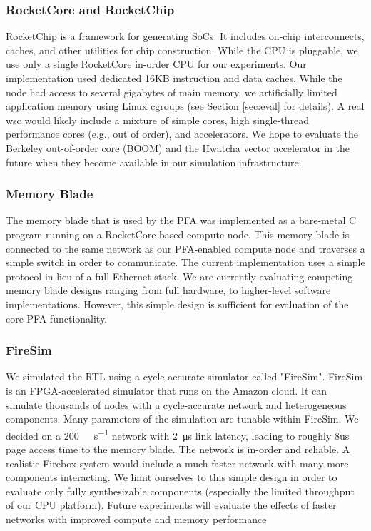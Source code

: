 \subsubsection{RocketCore and RocketChip}
RocketChip\cite{rocketchip} is a framework for generating SoCs. It includes
on-chip interconnects, caches, and other utilities for chip construction. While
the CPU is pluggable, we use only a single RocketCore in-order CPU for our
experiments. Our implementation used dedicated 16KB instruction and data
caches. While the node had access to several gigabytes of main memory, we
artificially limited application memory using Linux cgroups (see Section
\ref{sec:eval} for details). A real \gls{wsc} would likely include a mixture of
simple cores, high single-thread performance cores (e.g., out of order), and
accelerators. We hope to evaluate the Berkeley out-of-order core
(BOOM\cite{BOOM}) and the Hwatcha vector accelerator\cite{hwatcha} in the
future when they become available in our simulation infrastructure.

\subsubsection{Memory Blade}
The memory blade that is used by the PFA was implemented as a bare-metal C
program running on a RocketCore-based compute node. This memory blade is
connected to the same network as our PFA-enabled compute node and traverses a
simple switch in order to communicate. The current implementation uses a simple
protocol in lieu of a full Ethernet stack. We are currently evaluating
competing memory blade designs ranging from full hardware, to higher-level
software implementations. However, this simple design is sufficient for
evaluation of the core PFA functionality.

\subsubsection{FireSim}
We simulated the RTL using a cycle-accurate simulator called
"FireSim"\cite{firesim}. FireSim is an FPGA-accelerated simulator that runs on
the Amazon cloud. It can simulate thousands of nodes with a cycle-accurate
network and heterogeneous components.  Many parameters of the simulation are
tunable within FireSim. We decided on a \SI{200}{\giga\bit\per\second} network
with \SI{2}{\micro\second} link latency, leading to roughly 8us page access
time to the memory blade. The network is in-order and reliable. A realistic
Firebox system would include a much faster network with many more components
interacting. We limit ourselves to this simple design in order to evaluate only
fully synthesizable components (especially the limited throughput of our CPU
platform). Future experiments will evaluate the effects of faster networks with 
improved compute and memory performance

